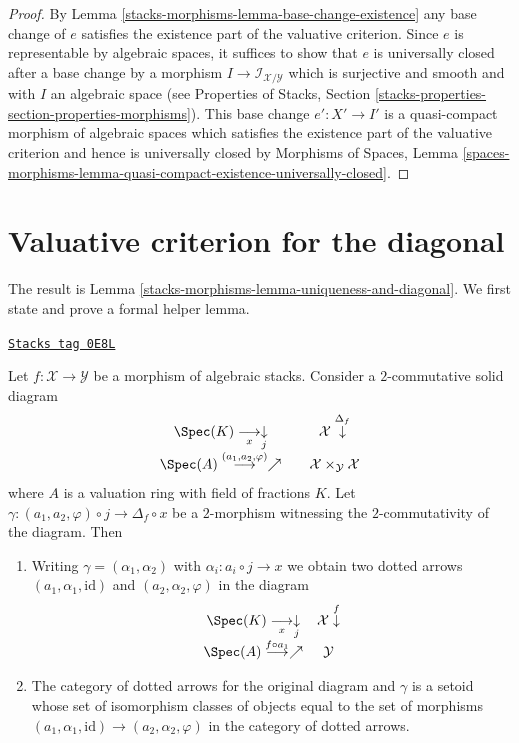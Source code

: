 \begin{proof}
\medskip\noindent
By Lemma \ref{stacks-morphisms-lemma-base-change-existence} any base change of $e$
satisfies the existence part of the valuative criterion.
Since $e$ is representable by algebraic spaces, it suffices to
show that $e$ is universally closed after a base change
by a morphism $I \to \mathcal{I}_{\mathcal{X}/\mathcal{Y}}$
which is surjective and smooth and with $I$ an algebraic space
(see Properties of Stacks, Section
\ref{stacks-properties-section-properties-morphisms}).
This base change $e' : X' \to I'$ is a quasi-compact
morphism of algebraic spaces which
satisfies the existence part of the valuative criterion
and hence is universally closed by
Morphisms of Spaces, Lemma
\ref{spaces-morphisms-lemma-quasi-compact-existence-universally-closed}.
\end{proof}

\section{Valuative criterion for the diagonal}
\label{stacks-morphisms-section-valuative-diagonal}
The result is Lemma \ref{stacks-morphisms-lemma-uniqueness-and-diagonal}.
We first state and prove a formal helper lemma.

\begin{lemma}
\label{stacks-morphisms-lemma-helper-diagonal}
\href{https://stacks.math.columbia.edu/tag/0E8L}{\texttt{Stacks tag 0E8L}}

Let $f : \mathcal{X} \to \mathcal{Y}$ be a morphism of algebraic stacks.
Consider a $2$-commutative solid diagram
$$
\begin{array}{ccc}\Spec(K) \underset{x}{\longrightarrow}\underset{j}{\downarrow} &  & \mathcal{X} \overset{\Delta_f}{\downarrow} \\ \Spec(A) \overset{(a_1, a_2, \varphi)}{\longrightarrow}\nearrow &  & \mathcal{X} \times_\mathcal{Y} \mathcal{X}\end{array}
$$
where $A$ is a valuation ring with field of fractions $K$. Let
$\gamma : (a_1, a_2, \varphi) \circ j \longrightarrow \Delta_f \circ x$
be a $2$-morphism witnessing the $2$-commutativity of the diagram.
Then
\begin{enumerate}
\item Writing $\gamma = (\alpha_1, \alpha_2)$ with
$\alpha_i : a_i \circ j \to x$ we obtain two dotted arrows
$(a_1, \alpha_1, \text{id})$ and $(a_2, \alpha_2, \varphi)$ in
the diagram
$$
\begin{array}{cc}\Spec(K) \underset{x}{\longrightarrow}\underset{j}{\downarrow} & \mathcal{X} \overset{f}{\downarrow} \\ \Spec(A) \overset{f \circ a_1}{\longrightarrow}\nearrow & \mathcal{Y}\end{array}
$$
\item The category of dotted arrows for the original diagram
and $\gamma$ is a setoid whose set of isomorphism
classes of objects equal to the set of morphisms
$(a_1, \alpha_1, \text{id}) \to (a_2, \alpha_2, \varphi)$ in
the category of dotted arrows.
\end{enumerate}
\end{lemma}

